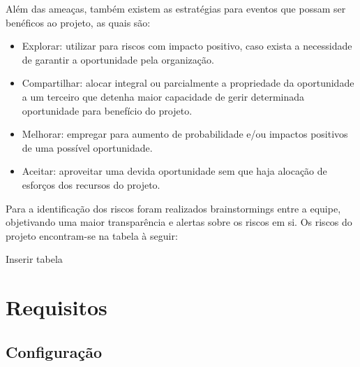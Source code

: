 Além das ameaças, também existem as estratégias para eventos que possam ser benéficos ao projeto, as quais são:

\begin{itemize}
	\item Explorar: utilizar para riscos com impacto positivo, caso exista a necessidade de garantir a oportunidade pela organização.
	\item Compartilhar: alocar integral ou parcialmente a propriedade da oportunidade a um terceiro que detenha maior capacidade de gerir determinada oportunidade para benefício do projeto.
	\item Melhorar: empregar para aumento de probabilidade e/ou impactos positivos de uma possível oportunidade.
	\item Aceitar: aproveitar uma devida oportunidade sem que haja alocação de esforços dos recursos do projeto.
\end{itemize}

Para a identificação dos riscos foram realizados brainstormings entre a equipe, objetivando uma maior transparência e alertas sobre os riscos em si. Os riscos do projeto encontram-se na tabela à seguir:

Inserir tabela
\begin{comment}
\begin{table}[h]
	\centering
	\label{tab01}
	
	\begin{tabular}{ccc}
		\toprule
		\textbf{Processing type} & \textbf{Property 1} (\%) & 
		\textbf{Property 2} $[\mu m]$ \\
		\midrule
		Process 1 & 40.0 & 22.7 \\
		Process 2 & 48.4 & 13.9 \\
		Process 3 & 39.0 & 22.5 \\
		Process 4 & 45.3 & 28.5 \\
		\bottomrule
	\end{tabular}

	\caption{Propriedades obtidades após processamento}
\end{table}
\end{comment}

\chapter[Requisitos]{Requisitos}

\section{Configuração}

